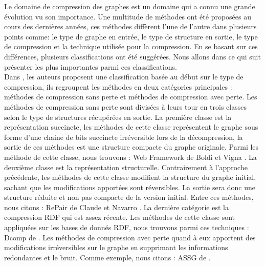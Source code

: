 Le domaine de compression des graphes est un domaine qui a connu une grande évolution vu son importance. Une multitude de méthodes ont été proposées au cours des dernières années, ces méthodes diffèrent l'une de l'autre dans plusieurs points comme: le type de graphe en entrée, le type de structure en sortie, le type de compression et la technique utilisée pour la compression. En se basant sur ces différences, plusieurs classifications ont été suggérées. Nous allons dans ce qui suit présenter les plus importantes parmi ces classifications.\\

Dans \citep{maneth2015survey}, les auteurs proposent une classification basée au début sur le type de compression, ils regroupent les méthodes en deux catégories principales : méthodes de compression sans perte et méthodes de compression avec perte. Les méthodes de compression sans perte sont divisées à leurs tour en trois classes selon le type de structures récupérées en sortie. La première classe est la représentation succincte, les méthodes de cette classe représentent le graphe sous forme d'une chaine de bits succincte irréversible lors de la décompression, la sortie de ces méthodes est une structure compacte du graphe originale. Parmi les méthode de cette classe, nous trouvons : Web Framework de Boldi et Vigna \citep{boldi2004webgraph}. La deuxième classe est la représentation structurelle. Contrairement à l'approche précédente, les méthodes de cette classe modifient la structure du graphe initial, sachant que les modifications apportées sont réversibles. La sortie sera donc une structure réduite et non pas compacte de la version initial. Entre ces méthodes, nous citons : RePair de Claude et Navarro \citep{claude2010fast}. La dernière catégorie est la compression RDF qui est assez récente. Les méthodes de cette classe sont appliquées sur les bases de donnés RDF, nous trouvons parmi ces techniques : Dcomp de \citep{martinez2012compression} . Les méthodes de compression avec perte quand à eux apportent des modifications irréversibles sur le graphe en supprimant les informations redondantes et le bruit. Comme exemple, nous citons : ASSG de \citep{zhang2014assg}.\\

